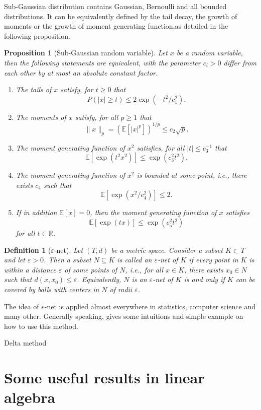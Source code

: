 \documentclass[MAL,biber]{nowfnt} %
\newcommand{\RED}{\color[rgb]{0.70,0,0}}
\newtheorem{Proposition}{Proposition}
\newtheorem{Definition}{Definition}
\newcommand{\RR}{{\mathbb{R}}}
\newcommand{\EE}{{\mathbb{E}}}
\begin{document}
Sub-Gaussian distribution contains Gaussian, Bernoulli and all bounded distributions. It can be equivalently defined by the tail decay, the growth of moments or the growth of moment generating function,as detailed in the following proposition.
\begin{Proposition}[Sub-Gaussian random variable]
Let $x$ be a random variable, then the following statements are equivalent, with the parameter $c_i > 0$ differ from each other by at most an absolute constant factor.
\begin{enumerate}
	\item The tails of $x$ satisfy, for $t \ge 0$ that
	\[
		P(|x| \ge t) \le 2 \exp(-t^2/c_1^2).
	\]
	\item The moments of $x$ satisfy, for all $p \ge 1$ that
	\[
		\| x \|_p = \left( \EE [|x|^p] \right)^{1/p} \le c_2 \sqrt{p}.
	\]
	\item The moment generating function of $x^2$ satisfies, for all $|t| \le c_3^{-1}$ that
	\[
	 	\EE [ \exp(t^2 x^2)] \le \exp(c_3^2 t^2).
	 \]
	 \item The moment generating function of $x^2$ is bounded at some point, i.e., there exists $c_4$ such that
	 \[
	 	\EE [ \exp(x^2/c_4^2) ] \le 2.
	 \]
	 \item If in addition $\EE[x] = 0$, then the moment generating function of $x$ satisfies
	 \[
	 	\EE[\exp(t x)] \le \exp(c_5^2 t^2)
	 \]
	 for all $t \in \RR$.
\end{enumerate}
\end{Proposition}

\begin{Definition}[$\varepsilon$-net]\label{def:epsilon-net}
Let $(T,d)$ be a metric space. Consider a subset $K \subset T$ and let $\varepsilon > 0$. Then a subset $N \subseteq K$ is called an $\varepsilon$-net of $K$ if every point in $K$ is within a distance $\varepsilon$ of some points of $N$, i.e., for all $x \in K$, there exists $x_0 \in N$ such that $d(x,x_0) \le \varepsilon$. Equivalently, $N$ is an $\varepsilon$-net of $K$ is and only if $K$ can be covered by balls with centers in $N$ of radii $\varepsilon$.
\end{Definition}

The idea of $\varepsilon$-net is applied almost everywhere in statistics, computer science and many other. Generally speaking, {\RED gives some intuitions and simple example on how to use this method.}

{\RED Delta method}


\chapter{Some useful results in linear algebra}
\end{document}
